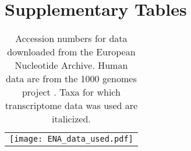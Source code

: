 \documentclass[11pt, oneside]{article}   	%
\begin{document}
\clearpage
\section{Supplementary Tables}
\begin{table}[ht]
  \caption{Accession numbers for data downloaded from the European Nucleotide Archive. Human data are from the 1000 genomes project \citep{1000GenomesProjectConsortium2010}. Taxa for which transcriptome data was used are italicized.}
  \centering
  \begin{tabular}{c}
     \texttt{[image: ENA\_data\_used.pdf]}
  \end{tabular}
  \label{table:ENAdata}
\end{table}

\end{document}
